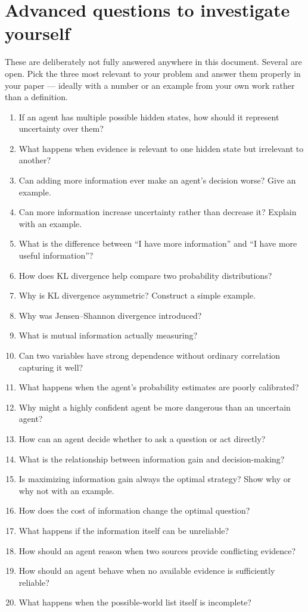 \documentclass[11pt,a4paper]{article}
\begin{document}
\section{Advanced questions to investigate yourself}
\label{app:advanced}

These are deliberately not fully answered anywhere in this document. Several are open. Pick the
three most relevant to your problem and answer them properly in your paper --- ideally with a
number or an example from your own work rather than a definition.

\begin{enumerate}[itemsep=2pt]
\item If an agent has multiple possible hidden states, how should it represent uncertainty over them?
\item What happens when evidence is relevant to one hidden state but irrelevant to another?
\item Can adding more information ever make an agent's decision worse? Give an example.
\item Can more information increase uncertainty rather than decrease it? Explain with an example.
\item What is the difference between ``I have more information'' and ``I have more useful information''?
\item How does KL divergence help compare two probability distributions?
\item Why is KL divergence asymmetric? Construct a simple example.
\item Why was Jensen--Shannon divergence introduced?
\item What is mutual information actually measuring?
\item Can two variables have strong dependence without ordinary correlation capturing it well?
\item What happens when the agent's probability estimates are poorly calibrated?
\item Why might a highly confident agent be more dangerous than an uncertain agent?
\item How can an agent decide whether to ask a question or act directly?
\item What is the relationship between information gain and decision-making?
\item Is maximizing information gain always the optimal strategy? Show why or why not with an example.
\item How does the cost of information change the optimal question?
\item What happens if the information itself can be unreliable?
\item How should an agent reason when two sources provide conflicting evidence?
\item How should an agent behave when no available evidence is sufficiently reliable?
\item What happens when the possible-world list itself is incomplete?
\end{enumerate}
\end{document}

